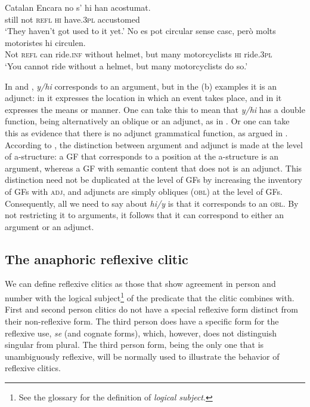 \documentclass[output=paper,hidelinks]{langscibook}
\begin{document}
\ea\label{ex:Romance:19} Catalan \citep{Todoli2002}
\ea\label{ex:Romance:19a}
\gll
Encara no s' hi han acostumat.\\
still not \textsc{refl} \textsc{hi} have.\textsc{3pl} accustomed\\
\glt   `They haven't got used to it yet.'
\ex\label{ex:Romance:19b}
\gll
No es pot circular sense casc, però molts motoristes hi circulen.\\
Not \textsc{refl} can ride.\textsc{inf} without helmet, but many motorcyclists \textsc{hi} ride.\textsc{3pl}\\
\glt   `You cannot ride without a helmet, but many motorcyclists do so.'
\z\z

In  and , \textit{y/hi} corresponds to an argument, but in the (b) examples it is an adjunct: in  it expresses the location in which an event takes place, and in  it expresses the means or manner. One can take this to mean that \textit{y/hi} has a double function, being alternatively an oblique or an adjunct, as in \citet{Schwarze2001}. Or one can take this as evidence that there is no adjunct grammatical function, as argued in \citet{alsina1996the-role}. According to \citet{alsina1996the-role}, the distinction between argument and adjunct is made at the level of a-structure: a GF that corresponds to a position at the a-structure is an argument, whereas a GF with semantic content that does not is an adjunct. This distinction need not be duplicated at the level of GFs by increasing the inventory of GFs with \textsc{adj,} and adjuncts are simply obliques (\textsc{obl}) at the level of GFs. Consequently, all we need to say about \textit{hi/y} is that it corresponds to an \textsc{obl}. By not restricting it to arguments, it follows that it can correspond to either an argument or an adjunct.

\subsection{The anaphoric reflexive clitic}
\label{sec:Romance:2.3}

We can define reflexive clitics as those that show agreement in person and number with the logical subject\footnote{See the glossary for the definition of \textit{logical subject}.} of the predicate that the clitic combines with. First and second person clitics do not have a special reflexive form distinct from their non-reflexive form. The third person does have a specific form for the reflexive use, \textit{se} (and cognate forms), which, however, does not distinguish singular from plural. The third person form, being the only one that is unambiguously reflexive, will be normally used to illustrate the behavior of reflexive clitics.
\end{document}

